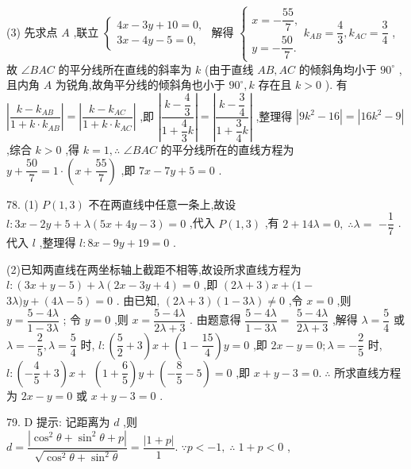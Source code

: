 (3) 先求点 $A$ ,联立 $\left\{  \begin{array}{l} {4x} - {3y} + {10} = 0, \\  {3x} - {4y} - 5 = 0, \end{array}\right.$ 解得 $\left\{  \begin{array}{l} x =  - \dfrac{55}{7}, \\  y =  - \dfrac{50}{7}. \end{array}\right. {k}_{AB} = \dfrac{4}{3},{k}_{AC} = \dfrac{3}{4}$ ,故 $\angle {BAC}$ 的平分线所在直线的斜率为 $k$ (由于直线 ${AB},{AC}$ 的倾斜角均小于 ${90}^{ \circ  }$ ,且内角 $A$ 为锐角,故角平分线的倾斜角也小于 ${90}^{ \circ  },k$ 存在且 $k > 0$ ). 有 $\left| \dfrac{k - {k}_{AB}}{1 + k \cdot  {k}_{AB}}\right|  = \left| \dfrac{k - {k}_{AC}}{1 + k \cdot  {k}_{AC}}\right|$ ,即 $\left| \dfrac{k - \dfrac{4}{3}}{1 + \dfrac{4}{3}k}\right|  = \left| \dfrac{k - \dfrac{3}{4}}{1 + \dfrac{3}{4}k}\right|$ ,整理得 $\left| {9{k}^{2} - {16}}\right|  = \left| {{16}{k}^{2} - 9}\right|$ ,综合 $k > 0$ ,得 $k = 1,\therefore$  $\angle {BAC}$ 的平分线所在的直线方程为 $y + \dfrac{50}{7} = 1 \cdot  \left( {x + \dfrac{55}{7}}\right)$ ,即 ${7x} - {7y} + 5 = 0$ .

78. (1) $P\left( {1,3}\right)$ 不在两直线中任意一条上,故设 $l : {3x} - {2y} + 5 + \lambda \left( {{5x} + {4y} - 3}\right)  = 0$ ,代入 $P\left( {1,3}\right)$ ,有 $2 + {14\lambda } = 0,\;\therefore \lambda  =$  $- \dfrac{1}{7}$ . 代入 $l$ ,整理得 $l : {8x} - {9y} + {19} = 0$ .

(2)已知两直线在两坐标轴上截距不相等,故设所求直线方程为 $l : \left( {{3x} + y - 5}\right)  + \lambda \left( {{2x} - {3y} + 4}\right)  = 0$ ,即 $\left( {{2\lambda } + 3}\right) x + (1 -$  ${3\lambda })y + \left( {{4\lambda } - 5}\right)  = 0$ . 由已知, $\left( {{2\lambda } + 3}\right) \left( {1 - {3\lambda }}\right)  \neq  0$ ,令 $x = 0$ ,则 $y = \dfrac{5 - {4\lambda }}{1 - {3\lambda }}$ ; 令 $y = 0$ ,则 $x = \dfrac{5 - {4\lambda }}{{2\lambda } + 3}$ . 由题意得 $\dfrac{5 - {4\lambda }}{1 - {3\lambda }} =$  $\dfrac{5 - {4\lambda }}{{2\lambda } + 3}$ ,解得 $\lambda  = \dfrac{5}{4}$ 或 $\lambda  =  - \dfrac{2}{5},\lambda  = \dfrac{5}{4}$ 时, $l : \left( {\dfrac{5}{2} + 3}\right) x + \left( {1 - \dfrac{15}{4}}\right) y = 0$ ,即 ${2x} - y = 0;\lambda  =  - \dfrac{2}{5}$ 时, $l : \left( {-\dfrac{4}{5} + 3}\right) x +$  $\left( {1 + \dfrac{6}{5}}\right) y + \left( {-\dfrac{8}{5} - 5}\right)  = 0$ ,即 $x + y - 3 = 0.\;\therefore$ 所求直线方程为 ${2x} - y = 0$ 或 $x + y - 3 = 0$ .

79. D 提示: 记距离为 $d$ ,则 $d = \dfrac{\left| {\cos }^{2}\theta  + {\sin }^{2}\theta  + p\right| }{\sqrt{{\cos }^{2}\theta  + {\sin }^{2}\theta }} = \dfrac{\left| 1 + p\right| }{1}.\;\because p <  - 1,\;\therefore \;1 + p < 0$ ,

